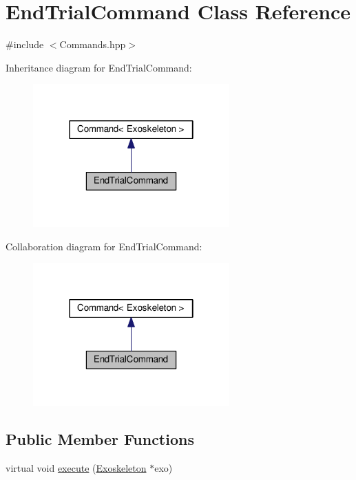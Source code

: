 \hypertarget{classEndTrialCommand}{}\section{End\+Trial\+Command Class Reference}
\label{classEndTrialCommand}


{\ttfamily \#include $<$Commands.\+hpp$>$}



Inheritance diagram for End\+Trial\+Command\+:\nopagebreak
\begin{figure}[H]
\begin{center}
\leavevmode
\includegraphics[width=214pt]{classEndTrialCommand__inherit__graph}
\end{center}
\end{figure}


Collaboration diagram for End\+Trial\+Command\+:\nopagebreak
\begin{figure}[H]
\begin{center}
\leavevmode
\includegraphics[width=214pt]{classEndTrialCommand__coll__graph}
\end{center}
\end{figure}
\subsection*{Public Member Functions}
\begin{DoxyCompactItemize}
\item 
virtual void \hyperlink{classEndTrialCommand_ac07f0eddff9b21da6cb302489aac19c7}{execute} (\hyperlink{classExoskeleton}{Exoskeleton} $\ast$exo)
\end{DoxyCompactItemize}


